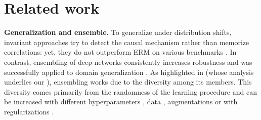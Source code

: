 \section{Related work}%
\label{sec:related_work}
\textbf{Generalization and ensemble.}
To generalize under distribution shifts, invariant approaches \cite{arjovsky2019invariant,krueger2020utofdistribution,rame_fishr_2021,coral216aaai,Sagawa2020Distributionally,ganin2016domain} try to detect the causal mechanism rather than memorize correlations: yet, they do not outperform ERM on various benchmarks \cite{gulrajani2021in,ye2021odbench,pmlr-v139-koh21a}.
In contrast, ensembling of deep networks \cite{Lakshminarayanan2017,hansen1990neural,krogh1995neural} consistently increases robustness \cite{Ovadia2019} and was successfully applied to domain generalization \cite{arpit2021ensemble,thopalli2021multidomain,Mesbah2022,li2022domain,lee2022diversify,pagliardini2022agree}.
As highlighted in \cite{ueda1996generalization} (whose analysis underlies our ), ensembling works due to the diversity among its members.
This diversity comes primarily from the randomness of the learning procedure \cite{Lakshminarayanan2017} and can be increased with different hyperparameters \cite{wenzel2020hyperparameter}, data \cite{breiman1996bagging,nixon2020why,Yeo2021}, augmentations \cite{wen2021combining,rame2021ixmo} or with regularizations \cite{lee2022diversify,pagliardini2022agree,rame2021dice,teneydiv}.%

